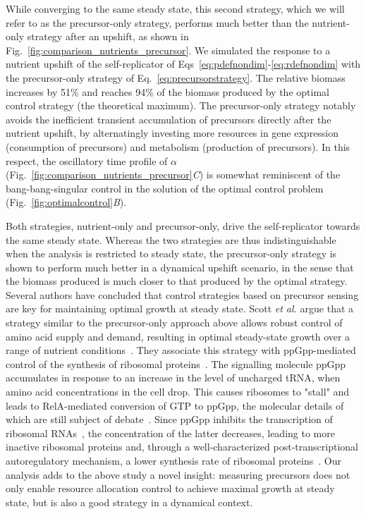 While converging to the same steady state, this second strategy, which we will refer to as the precursor-only strategy, performs much better than the nutrient-only strategy after an upshift, as shown in Fig.~\ref{fig:comparison_nutrients_precursor}.
We simulated the response to a nutrient upshift of the self-replicator of Eqs~\ref{eq:pdefnondim}-\ref{eq:rdefnondim} with the precursor-only strategy of Eq.~\ref{eq:precursorstrategy}.
The relative biomass increases by 51\% and reaches 94\% of the biomass produced by the optimal control strategy (the theoretical maximum).
The precursor-only strategy notably avoids the inefficient transient accumulation of precursors directly after the nutrient upshift, by alternatingly investing more resources in gene expression (consumption of precursors) and metabolism (production of precursors).
In this respect, the oscillatory time profile of $\alpha$ (Fig.~\ref{fig:comparison_nutrients_precursor}\textit{C}) is somewhat reminiscent of the bang-bang-singular control in the solution of the optimal control problem (Fig.~\ref{fig:optimalcontrol}\textit{B}).

Both strategies, nutrient-only and precursor-only, drive the self-replicator towards the same steady state.
Whereas the two strategies are thus indistinguishable when the analysis is restricted to steady state, the precursor-only strategy is shown to perform much better in a dynamical upshift scenario, in the sense that the biomass produced is much closer to that produced by the optimal strategy.
Several authors have concluded that control strategies based on precursor sensing are key for maintaining optimal growth at steady state.
Scott \textit{et al.} argue that a strategy similar to the precursor-only approach above allows robust control of amino acid supply and demand, resulting in optimal steady-state growth over a range of nutrient conditions~\cite{scott_emergence_2014}.
They associate this strategy with ppGpp-mediated control of the synthesis of ribosomal proteins~\cite{dalebroux_ppgpp_2012,potrykus_pppgpp_2008,hauryliuk_recent_2015}.
The signalling molecule ppGpp accumulates in response to an increase in the level of uncharged tRNA, when amino acid concentrations in the cell drop. 
This causes ribosomes to "stall" and leads to RelA-mediated conversion of GTP to ppGpp, the molecular details of which are still subject of debate~\cite{english_singlemolecule_2011,hauryliuk_recent_2015}.
Since ppGpp inhibits the transcription of ribosomal RNAs~\cite{dennis_control_2004}, the concentration of the latter decreases, leading to more inactive ribosomal proteins and, through a well-characterized post-transcriptional autoregulatory mechanism, a lower synthesis rate of ribosomal proteins~\cite{keener_regulation_1996,potrykus_pppgpp_2008}.
Our analysis adds to the above study a novel insight: measuring precursors does not only enable resource allocation control to achieve maximal growth at steady state, but is also a good strategy in a dynamical context.

